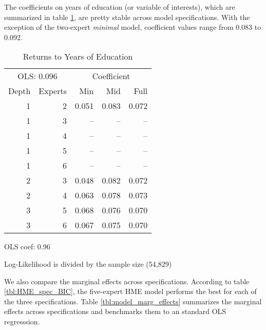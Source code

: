 \documentclass[12pt]{article}
\begin{document}
The coefficients on years of education (or variable of interests), which
are summarized in table \ref{tbl:YrsEdu_coef}, are pretty
stable across model specifications. With the exception of the two-expert
\textit{minimal} model, coefficient values range from 0.083 to 0.092. 


\begin{table} \centering
  \caption{Returns to Years of Education}
  \begin{threeparttable}
    \begin{tabular}[l]{r r r r r}
  \cmidrule{1-5}
  \multicolumn{2}{c}{OLS: 0.096}   & \multicolumn{3}{c}{Coefficient} \\ 
  \cmidrule(r){3-5}
  Depth & Experts & Min   & Mid   & Full       \\
  \cmidrule{1-5}

  1     & 2       & 0.051 & 0.083 & 0.072      \\
  1     & 3       & --    & --    & --         \\
  1     & 4       & --    & --    & --         \\
  1     & 5       & --    & --    & --         \\
  1     & 6       & --    & --    & --         \\
  2     & 3       & 0.048 & 0.082 & 0.072      \\
  2     & 4       & 0.063 & 0.078 & 0.073      \\
  3     & 5       & 0.068 & 0.076 & 0.070      \\
  3     & 6       & 0.067 & 0.075 & 0.070      \\

  \hline
    \end{tabular}
    \begin{tablenotes}
      \item{\footnotesize OLS coef: 0.96}
      \item{\footnotesize Log-Likelihood is divided by the sample size (54,829)}
    \end{tablenotes} \label{tbl:YrsEdu_coef}
  \end{threeparttable}
\end{table}

We also compare the marginal effects across specifications. According to table
\ref{tbl:HME_spec_BIC}, the five-expert HME model performs the best for each
of the three specifications. Table \ref{tbl:model_marg_effects} summarizes
the marginal effects across specifications and benchmarks them to an standard
OLS regresssion.
\end{document}
